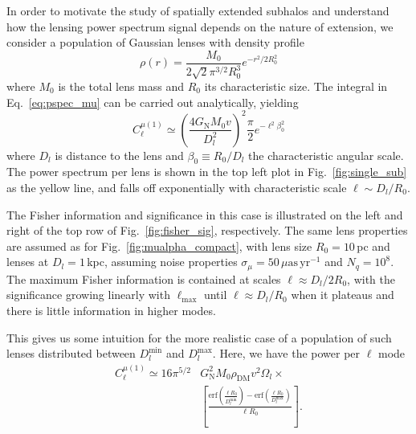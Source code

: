 \documentclass[prd,aps,10pt,nofootinbib,twocolumn,superscriptaddress,preprintnumbers,balancelastpage,longbibliography]{revtex4-1}
\newcommand{\GN}{G_\mathrm{N}}
\begin{document}
In order to motivate the study of spatially extended subhalos and understand how the lensing power spectrum signal depends on the nature of extension, we consider a population of Gaussian lenses with density profile 
\begin{equation}
\rho(r) =\frac{M_0}{2\sqrt{2}\pi^{3/2}R_0^3} e^{-r^2/2R_0^2} 
\label{eq:Gaussianrho}
\end{equation} 
where $M_0$ is the total lens mass and $R_0$ its characteristic size. The integral in Eq.~\ref{eq:pspec_mu} can be carried out analytically, yielding
\begin{equation}
C_{\ell}^{\mu (1)} \simeq \left(\frac{4 \GN M_0 v}{D_l^2}\right)^2 \frac{\pi}{2} e^{-\ell^2\beta_0^2}
 \label{eq:mu_ext}
\end{equation}
where $D_l$ is distance to the lens and $\beta_0 \equiv R_0/D_l$ the characteristic angular scale. The power spectrum per lens is shown in the top left plot in Fig.~\ref{fig:single_sub} as the yellow line, and falls off exponentially with characteristic scale $\ell \sim D_l/R_0$.

The Fisher information and significance in this case is illustrated on the left and right of the top row of Fig.~\ref{fig:fisher_sig}, respectively. The same lens properties are assumed as for Fig.~\ref{fig:mualpha_compact}, with lens size $R_0=10$\,pc and lenses at $D_l=1$\,kpc, assuming noise properties $\sigma_\mu = 50\,\mu\mathrm{as}\,\mathrm{yr}^{-1}$ and $N_q = 10^8$. The maximum Fisher information is contained at scales $\ell \approx {D_l}/{2R_0}$, with the significance growing linearly with $\ell_\mathrm{max}$ until $\ell \approx {D_l}/{R_0}$ when it plateaus and there is little information in higher modes. 

This gives us some intuition for the more realistic case of a population of such lenses distributed between $D_l^{\mathrm{min}}$ and $D_l^{\mathrm{max}}$. Here, we have the power per $\ell$ mode 
\begin{align}
C_{\ell}^{\mu (1)} \simeq 16 \pi ^{5/2} &G_\mathrm{N}^2 M_0 \rho_\mathrm{DM} v^2 \Omega_l\times\nonumber\\ &\left[\frac{{\mathrm{erf}}\left(\frac{\ell
   {R_0}}{D_l^{\mathrm{min}}}\right)-{\mathrm{erf}}\left(\frac{\ell {R_0}}{{D_l^{\mathrm{max}}}}\right)}{\ell {R_0}}\right].
 \label{eq:mu_extpop}
\end{align}
\end{document}
